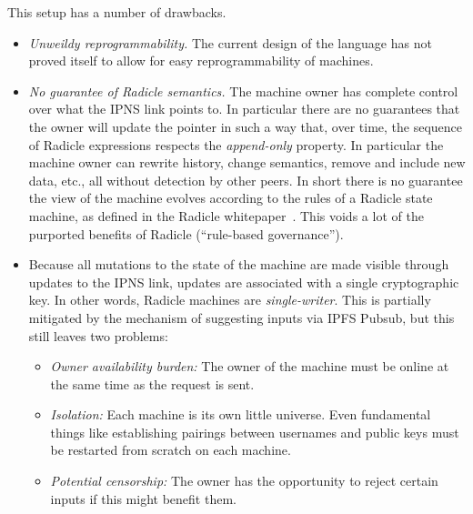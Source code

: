 \documentclass[a4paper, oneside, 10pt]{amsart}
\begin{document}
This setup has a number of drawbacks.
\begin{itemize}
  \item \emph{Unweildy reprogrammability.} The current design of the language
    has not proved itself to allow for easy reprogrammability of machines.
  \item \emph{No guarantee of Radicle semantics.} The machine owner has complete
    control over what the IPNS link points to. In particular there are no
    guarantees that the owner will update the pointer in such a way that, over
    time, the sequence of Radicle expressions respects the \emph{append-only}
    property. In particular the machine owner can rewrite history, change
    semantics, remove and include new data, etc., all without detection by other
    peers. In short there is no guarantee the view of the machine evolves
    according to the rules of a Radicle state machine, as defined in the Radicle
    whitepaper~\cite{radicle}. This voids a lot of the purported benefits of
    Radicle (``rule-based governance'').
  \item Because all mutations to the state of the machine are made visible
    through updates to the IPNS link, updates are associated with a single
    cryptographic key. In other words, Radicle machines are
    \emph{single-writer}. This is partially mitigated by the mechanism of
    suggesting inputs via IPFS Pubsub, but this still leaves two problems:
    \begin{itemize}
    \item \emph{Owner availability burden:} The owner of the machine must be
      online at the same time as the request is sent.
    \item \emph{Isolation:} Each machine is its own little universe. Even
      fundamental things like establishing pairings between usernames and public
      keys must be restarted from scratch on each machine.
    \item \emph{Potential censorship:} The owner has the opportunity to reject
      certain inputs if this might benefit them.
    \end{itemize}
\end{itemize}
\end{document}
